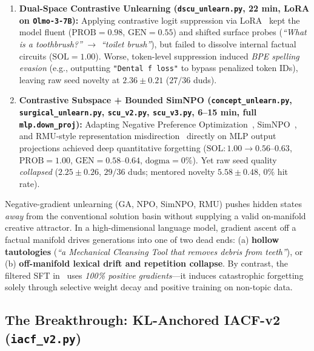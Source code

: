 \documentclass[10.5pt,letterpaper]{article}
\begin{document}
\begin{enumerate}
  \item \textbf{Dual-Space Contrastive Unlearning (\texttt{dscu\_unlearn.py}, 22 min, LoRA on \texttt{Olmo-3-7B}):} Applying contrastive logit suppression via LoRA~\cite{hu2022lora} kept the model fluent ($\text{PROB}\!=\!0.98$, $\text{GEN}\!=\!0.55$) and shifted surface probes (\emph{``What is a toothbrush?''} $\to$ \emph{``toilet brush''}), but failed to dissolve internal factual circuits ($\text{SOL}\!=\!1.00$). Worse, token-level suppression induced \emph{BPE spelling evasion} (e.g., outputting \texttt{"Dental f loss"} to bypass penalized token IDs), leaving raw seed novelty at $2.36 \pm 0.21$ ($27/36$ duds).
  \item \textbf{Contrastive Subspace + Bounded SimNPO (\texttt{concept\_unlearn.py}, \texttt{surgical\_unlearn.py}, \texttt{scu\_v2.py}, \texttt{scu\_v3.py}, 6--15 min, full \texttt{mlp.down\_proj}):} Adapting Negative Preference Optimization~\cite{zhang2024npo}, SimNPO~\cite{fan2024simnpo}, and RMU-style representation misdirection~\cite{li2024wmdp} directly on MLP output projections achieved deep quantitative forgetting ($\text{SOL}: 1.00 \to 0.56\text{--}0.63$, $\text{PROB}\!=\!1.00$, $\text{GEN}\!=\!0.58\text{--}0.64$, $\text{dogma}\!=\!0\%$). Yet raw seed quality \emph{collapsed} ($2.25 \pm 0.26$, $29/36$ duds; mentored novelty $5.58 \pm 0.48$, $0\%$ hit rate).
\end{enumerate}

\begin{takeaway}
Negative-gradient unlearning (GA, NPO, SimNPO, RMU) pushes hidden states \emph{away} from the conventional solution basin without supplying a valid on-manifold creative attractor. In a high-dimensional language model, gradient ascent off a factual manifold drives generations into one of two dead ends: (a) \textbf{hollow tautologies} (\emph{``a Mechanical Cleansing Tool that removes debris from teeth''}), or (b) \textbf{off-manifold lexical drift and repetition collapse}. By contrast, the filtered SFT in~\cite{dambrosio2026value} uses \emph{100\% positive gradients}---it induces catastrophic forgetting solely through selective weight decay and positive training on non-topic data.
\end{takeaway}

\subsection{The Breakthrough: KL-Anchored IACF-v2 (\texttt{iacf\_v2.py})}
\end{document}
